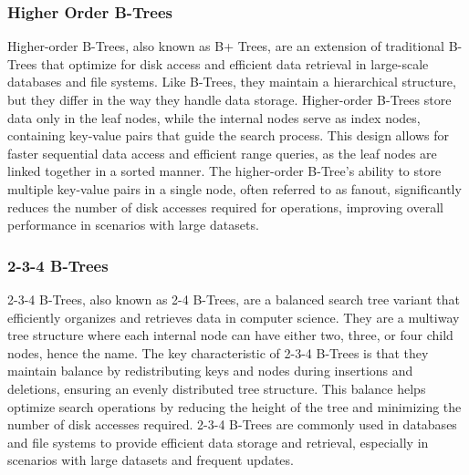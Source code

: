 \subsubsection{Higher Order B-Trees}

Higher-order B-Trees, also known as B+ Trees, are an extension of traditional B-Trees that optimize for disk access and efficient data retrieval in large-scale databases and file systems. Like B-Trees, they maintain a hierarchical structure, but they differ in the way they handle data storage. Higher-order B-Trees store data only in the leaf 
nodes, while the internal nodes serve as index nodes, containing key-value pairs that guide the search process. This design allows for faster sequential data access and efficient range queries, as the leaf nodes are linked together in a sorted manner. The higher-order B-Tree's ability to store multiple key-value pairs in a single node, often referred 
to as fanout, significantly reduces the number of disk accesses required for operations, improving overall performance in scenarios with large datasets.

\subsubsection{2-3-4 B-Trees}

2-3-4 B-Trees, also known as 2-4 B-Trees, are a balanced search tree variant that efficiently organizes and retrieves data in computer science. They are a multiway tree structure where each internal node can have either two, three, or four child nodes, hence the name. The key characteristic of 2-3-4 B-Trees is that they maintain balance by redistributing 
keys and nodes during insertions and deletions, ensuring an evenly distributed tree structure. This balance helps optimize search operations by reducing the height of the tree and minimizing the number of disk accesses required. 2-3-4 B-Trees are commonly used in databases and file systems to provide efficient data storage and retrieval, especially 
in scenarios with large datasets and frequent updates.

